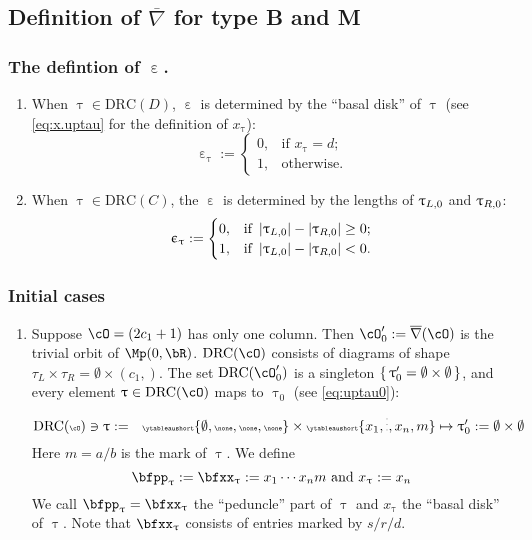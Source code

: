 \documentclass[12pt,a4paper]{amsart}
\def\abs#1{\left|{#1}\right|}
\def\eDD{\overline{\nabla}}
\numberwithin{equation}{section}
\theoremstyle{remark}
\def\drc{\mathrm{DRC}}
\let\ytb=\ytableaushort
\def\cOp{\cO^{\prime}}
\def\uptaup{\uptau^{\prime}}
\begin{document}
\subsection{Definition of $\eDD$ for type B and M}


\subsubsection{The defintion of $\upepsilon$.} \label{sec:upepsilon}
\begin{enumerate}[label=(\arabic*).,series=alg1]
  \item When $\uptau\in \drc(D)$, $\upepsilon$ is determined by the ``basal
  disk'' of $\uptau$ (see \eqref{eq:x.uptau} for the definition of $x_{\uptau}$):
  \[
    \upepsilon_{\uptau}:=
    \begin{cases}
      0, & \text{if $x_{\uptau}=d$;} \\
      1, & \text{otherwise.}
    \end{cases}
  \]
  \item When $\uptau\in \drc(C)$, the  $\upepsilon$  is determined by
  the lengths of $\uptau_{L,0}$ and $\uptau_{R,0}$:
  \[
    \upepsilon_{\uptau} :=
    \begin{cases}
      0, & \text{if }\abs{\taulf} - \abs{\taurf} \geq  0;\\
      1, & \text{if }\abs{\taulf} - \abs{\taurf}<0.
    \end{cases}
  \]
\end{enumerate}


\subsubsection{Initial cases}

\begin{enumerate}[resume*=alg1]
  \item Suppose $\cO = (2c_{1}+1)$ has only one column. Then
        $\cOp_{0}:=\eDD(\cO)$ is the trivial orbit of $\Mp(0,\bR)$. $\drc(\cO)$
        consists of diagrams of shape
        $\tau_{L}\times \tau_{R} =\emptyset\times (c_{1},)$.
        The set $\drc(\cOp_{0})$ is a singleton $\set{\uptaup_{0}=\emptyset\times \emptyset}$, and every element
        $\uptau \in \drc(\cO)$ maps to $\uptau_{0}$ (see \eqref{eq:uptau0}):
        \[\tiny
          \drc(\cO)\ni \uptau:= \hspace{1em} \ytb{\emptyset,\none,\none,\none}
          \times \ytb{{x_{1}},\vdots,{x_{n}},{m}}
          \mapsto \uptaup_{0}:=\emptyset\times \emptyset
        \]
        Here $m=a/b$ is the mark of $\uptau$.
        We define
        \[
          \bfpp_{\uptau}:=\bfxx_{\uptau} := x_{1}\cdots x_{n} m  \text{ and }x_{\uptau}:=x_{n}
        \]
        We call $\bfpp_{\uptau}=\bfxx_{\uptau}$ the ``peduncle'' part of $\uptau$ and
        $x_{\uptau}$ the
        ``basal disk'' of $\uptau$.
        Note that $\bfxx_{\uptau}$ consists of entries marked by $s/r/d$.
\end{enumerate}
\end{document}
